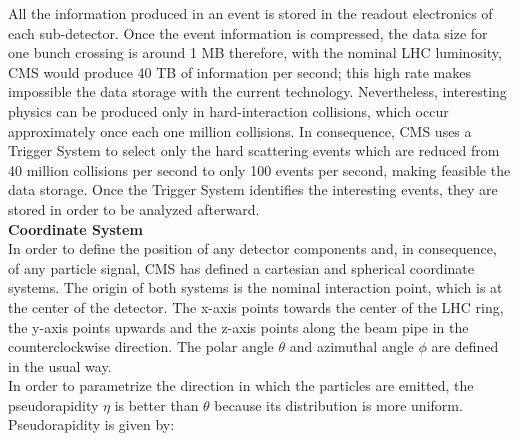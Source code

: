 \noindent All the information produced in an event is stored in the readout electronics 
of each sub-detector. Once the event information is compressed, the data size
for one bunch crossing is around 1 MB therefore, with the nominal LHC luminosity, CMS would 
produce 40 TB of information per second; this high rate makes impossible 
the data storage with the current technology. Nevertheless, interesting physics can be produced only 
in hard-interaction collisions, which occur approximately once each one million 
collisions. In consequence, CMS uses a Trigger System to select only the hard 
scattering events which are reduced from 40 million collisions per second 
to only 100 events per second, making feasible the data storage. Once the 
Trigger System identifies the interesting events, they are stored in order to be 
analyzed afterward. \\


\textbf{Coordinate System}\\


\noindent In order to define the position of any detector components and, in consequence,
of any particle signal, CMS has defined a cartesian and spherical 
coordinate systems. The origin of both systems is the nominal interaction point, which is at the center
of the detector. The x-axis points towards the center of the LHC ring,
the y-axis points upwards and the z-axis points along the beam pipe in the
counterclockwise direction. The polar angle $\theta$ and azimuthal angle $\phi$ are defined 
in the usual way. \\

\noindent In order to parametrize the direction in which the particles are emitted,
the pseudorapidity $\eta$ is better than $\theta$ because its distribution
is more uniform. Pseudorapidity is given by:

